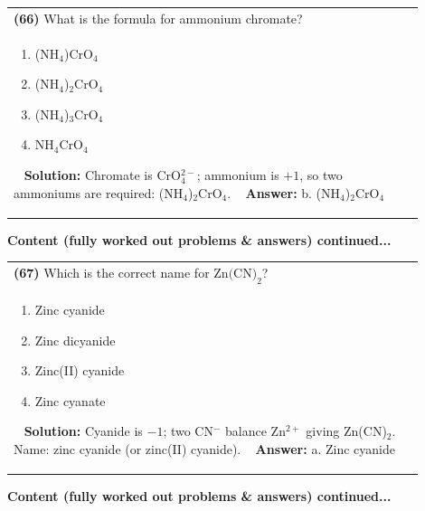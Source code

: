 \documentclass{article}
\begin{document}
\begin{tabular}{|p{0.9\linewidth}|}
\hline
\vspace{0.2cm}
\textbf{(66)} What is the formula for ammonium chromate? \\
\begin{minipage}[t]{0.85\linewidth}
\begin{enumerate}[label=\alph*.]
\item (NH$_4$)CrO$_4$ \
\item (NH$_4$)$_2$CrO$_4$ \
\item (NH$_4$)$_3$CrO$_4$ \
\item NH$_4$CrO$_4$
\end{enumerate}
\end{minipage}\
\hline
\vspace{0.2cm}
\textbf{Solution:} Chromate is CrO$_4^{2-}$; ammonium is $+1$, so two ammoniums are required: (NH$_4$)$_2$CrO$_4$. \
\hline
\vspace{0.2cm}
\textbf{Answer:} b. (NH$_4$)$_2$CrO$_4$ \
\hline
\end{tabular}
\newpage
\noindent
{\large\textbf{Content (fully worked out problems & answers) continued...}}\\[0.2em]
\begin{tabular}{|p{0.9\linewidth}|}
\hline
\vspace{0.2cm}
\textbf{(67)} Which is the correct name for $\text{Zn(CN)}_2$? \\
\begin{minipage}[t]{0.85\linewidth}
\begin{enumerate}[label=\alph*.]
\item Zinc cyanide \
\item Zinc dicyanide \
\item Zinc(II) cyanide \
\item Zinc cyanate
\end{enumerate}
\end{minipage}\
\hline
\vspace{0.2cm}
\textbf{Solution:} Cyanide is $-1$; two CN$^-$ balance Zn$^{2+}$ giving Zn(CN)$_2$. Name: zinc cyanide (or zinc(II) cyanide). \
\hline
\vspace{0.2cm}
\textbf{Answer:} a. Zinc cyanide \
\hline
\end{tabular}
\newpage
\noindent
{\large\textbf{Content (fully worked out problems & answers) continued...}}\\[0.2em]
\end{document}
